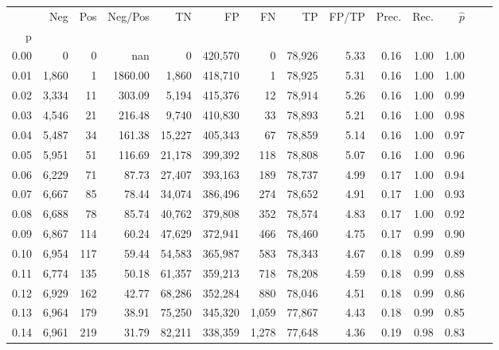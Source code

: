 \begin{tabular}{rrrrrrrrrrrrrr}
\toprule
{} &    Neg &    Pos &  Neg/Pos &       TN &       FP &      FN &      TP & FP/TP & Prec. &  Rec. & $\hat{p}$ \\
p    &        &        &          &          &          &         &         &       &       &       &           \\
\midrule
0.00 &      0 &      0 &      nan &        0 &  420,570 &       0 &  78,926 &  5.33 &  0.16 &  1.00 &      1.00 \\
0.01 &  1,860 &      1 &  1860.00 &    1,860 &  418,710 &       1 &  78,925 &  5.31 &  0.16 &  1.00 &      1.00 \\
0.02 &  3,334 &     11 &   303.09 &    5,194 &  415,376 &      12 &  78,914 &  5.26 &  0.16 &  1.00 &      0.99 \\
0.03 &  4,546 &     21 &   216.48 &    9,740 &  410,830 &      33 &  78,893 &  5.21 &  0.16 &  1.00 &      0.98 \\
0.04 &  5,487 &     34 &   161.38 &   15,227 &  405,343 &      67 &  78,859 &  5.14 &  0.16 &  1.00 &      0.97 \\
0.05 &  5,951 &     51 &   116.69 &   21,178 &  399,392 &     118 &  78,808 &  5.07 &  0.16 &  1.00 &      0.96 \\
0.06 &  6,229 &     71 &    87.73 &   27,407 &  393,163 &     189 &  78,737 &  4.99 &  0.17 &  1.00 &      0.94 \\
0.07 &  6,667 &     85 &    78.44 &   34,074 &  386,496 &     274 &  78,652 &  4.91 &  0.17 &  1.00 &      0.93 \\
0.08 &  6,688 &     78 &    85.74 &   40,762 &  379,808 &     352 &  78,574 &  4.83 &  0.17 &  1.00 &      0.92 \\
0.09 &  6,867 &    114 &    60.24 &   47,629 &  372,941 &     466 &  78,460 &  4.75 &  0.17 &  0.99 &      0.90 \\
0.10 &  6,954 &    117 &    59.44 &   54,583 &  365,987 &     583 &  78,343 &  4.67 &  0.18 &  0.99 &      0.89 \\
0.11 &  6,774 &    135 &    50.18 &   61,357 &  359,213 &     718 &  78,208 &  4.59 &  0.18 &  0.99 &      0.88 \\
0.12 &  6,929 &    162 &    42.77 &   68,286 &  352,284 &     880 &  78,046 &  4.51 &  0.18 &  0.99 &      0.86 \\
0.13 &  6,964 &    179 &    38.91 &   75,250 &  345,320 &   1,059 &  77,867 &  4.43 &  0.18 &  0.99 &      0.85 \\
0.14 &  6,961 &    219 &    31.79 &   82,211 &  338,359 &   1,278 &  77,648 &  4.36 &  0.19 &  0.98 &      0.83 \\

\end{tabular}
